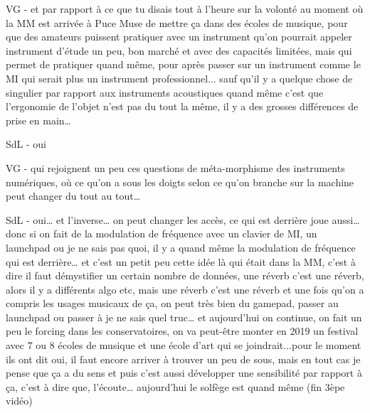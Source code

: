 VG - et par rapport à ce que tu disais tout à l'heure sur la volonté au moment où la MM est arrivée à Puce Muse de mettre ça dans des écoles de musique, pour que des amateurs puissent pratiquer avec un instrument qu'on pourrait appeler instrument d'étude un peu, bon marché et avec des capacités limitées, mais qui permet de pratiquer quand même, pour après passer sur un instrument comme le MI qui serait plus un instrument professionnel... sauf qu'il y a quelque chose de singulier par rapport aux instruments acoustiques quand même c'est que l'ergonomie de l'objet n'est pas du tout la même, il y a des grosses différences de prise en main… 

SdL - oui 

VG - qui rejoignent un peu ces questions de méta-morphisme des instruments numériques, où ce qu'on a sous les doigts selon ce qu'on branche sur la machine peut changer du tout au tout… 

SdL - oui… et l'inverse… on peut changer les accès, ce qui est derrière joue aussi… donc si on fait de la modulation de fréquence avec un clavier de MI, un launchpad ou je ne sais pas quoi, il y a quand même la modulation de fréquence qui est derrière… et c'est un petit peu cette idée là qui était dans la MM, c'est à dire il faut démystifier un certain nombre de données, une réverb c'est une réverb, alors il y a différents algo etc, mais une réverb c'est une réverb et une fois qu'on a compris les usages musicaux de ça, on peut très bien du gamepad, passer au launchpad ou passer à je ne sais quel truc… et aujourd'hui on continue, on fait un peu le forcing dans les conservatoires, on va peut-être monter en 2019 un festival avec 7 ou 8 écoles de musique et une école d'art qui se joindrait...pour le moment ils ont dit oui, il faut encore arriver à trouver un peu de sous, mais en tout cas je pense que ça a du sens et puis c'est aussi développer une sensibilité par rapport à ça, c'est à dire que, l'écoute… aujourd'hui le solfège est quand même (fin 3èpe vidéo) 

